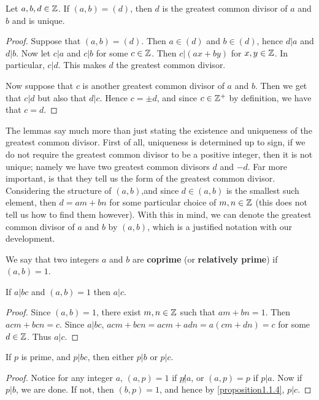 \begin{lemma}\label{lemma1.1.3}
    Let $a,b,d \in \mathbb{Z}$. If $(a,b)=(d)$, then $d$ is the greatest common divisor of $a$ and $b$ and is unique.
\end{lemma}
\begin{proof}
    Suppose that $(a,b)=(d)$. Then $a \in (d)$ and $b \in(d)$, hence $d|a$ and $d|b$. Now let $c|a$ and $c|b$ for some $c \in \mathbb{Z}$. Then $c|(ax+by)$ for $x,y \in \mathbb{Z}$. In particular, $c|d$. This makes $d$ the greatest common divisor.
    
    Now suppose that $c$ is another greatest common divisor of $a$ and $b$. Then we get that $c|d$ but also that $d|c$. Hence $c=\pm{d}$, and since $c \in \mathbb{Z}^+$ by definition, we have that $c=d$.
\end{proof}

The lemmas say much more than just stating the existence and uniqueness of the greatest common divisor. First of all, uniqueness is determined up to sign, if we do not require the greatest common divisor to be a positive integer, then it is not unique; namely we have two greatest common divisors $d$ and $-d$. Far more important, is that they tell us the form of the greatest common divisor. Considering the structure of $(a,b)$,and since $d \in (a,b)$ is the smallest such element, then $d=am+bn$ for some particular choice of $m,n \in \mathbb{Z}$ (this does not tell us how to find them however). With this in mind, we can denote the greatest common divisor of $a$ and $b$ by $(a,b)$, which is a justified notation with our development.

\begin{definition}
    We say that two integers $a$ and $b$ are \textbf{coprime} (or \textbf{relatively prime}) if $(a,b)=1$. 
\end{definition}

\begin{proposition}\label{proposition1.1.4}
    If $a|bc$ and $(a,b)=1$ then $a|c$.
\end{proposition}
\begin{proof}
    Since $(a,b)=1$, there exist $m,n \in \mathbb{Z}$ such that $am+bn=1$. Then $acm+bcn=c$. Since $a|bc$, $acm+bcn=acm+adn=a(cm+dn)=c$ for some $d \in \mathbb{Z}$. Thus $a|c$. 
\end{proof}

\begin{corollary}
    If $p$ is prime, and $p|bc$, then either $p|b$ or $p|c$. 
\end{corollary}
\begin{proof}
    Notice for any integer $a$, $(a,p)=1$ if $p \not| a$, or $(a,p)=p$ if $p|a$. Now if $p|b$, we are done. If not, then $(b,p)=1$, and hence by \ref{proposition1.1.4}, $p|c$. 
\end{proof}

